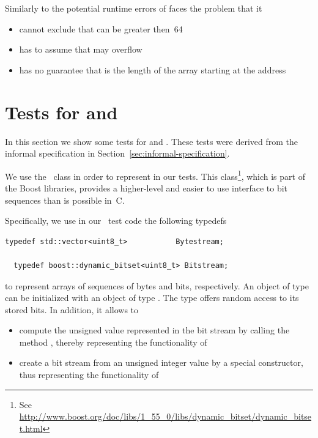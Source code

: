 Similarly to the potential runtime errors of \peek \framacwp
faces the problem that it

\begin{itemize}
\item cannot exclude that  can be greater then~64 
\item has to assume that  may overflow
\item has no guarantee that  is the length 
      of the array starting at the address 
\end{itemize}

\clearpage

\clearpage

\section{Tests for \peek and \poke}
\label{sec:bitwalker-tests}

In this section we show some tests for \peek and \poke.
These tests were derived from the informal specification in 
Section~\ref{sec:informal-specification}.

We use the \CC\ class  in order to represent
 in our tests.
This class\footnote{
  See \url{http://www.boost.org/doc/libs/1_55_0/libs/dynamic_bitset/dynamic_bitset.html}
},
which is part of the \textsf{Boost} libraries,
provides a higher-level and easier to use interface to bit sequences than is possible in~C.

Specifically, we use in our \CC\ test code the following typedefs

\begin{lstlisting}[style = acsl-block]
  typedef std::vector<uint8_t>           Bytestream;

  typedef boost::dynamic_bitset<uint8_t> Bitstream;
\end{lstlisting}

to represent arrays of sequences of bytes and bits, respectively.
An object of type  can be initialized with an object
of type . The type  offers random access
to its stored bits.
In addition, it allows to
\begin{itemize}
\item  compute the unsigned value represented in the bit stream by calling the
       method , thereby representing the functionality of \peek
\item  create a bit stream from an unsigned integer value by a special constructor,
       thus representing the functionality of \poke
\end{itemize}


